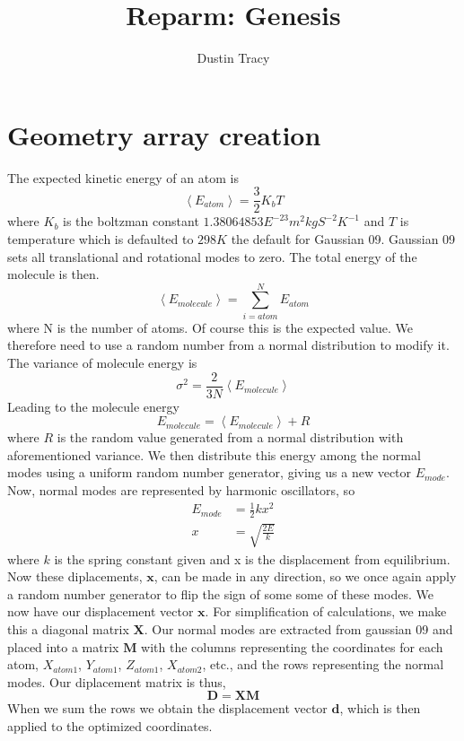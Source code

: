 \documentclass[12pt]{article}
\title{Reparm: Genesis}
\author{Dustin Tracy}
\begin{document}
\maketitle

\section{Geometry array creation}
The expected kinetic energy of an atom is
\begin{equation}
  \label{eq:energy_atom}
  \left<E_{atom}\right>=\frac{3}{2}K_{b}T
\end{equation}
where $K_b$ is the boltzman constant $1.38064853E^{-23}m^2kgS^{-2}K^{-1}$ and $T$ is temperature which is defaulted to $298K$ the default for Gaussian 09.
Gaussian 09 sets all translational and rotational modes to zero.
The total energy of the molecule is then.
\begin{equation}
  \label{eq:energy_molecule}
 \left<E_{molecule}\right>=\sum_{i=atom}^{N}E_{atom}
\end{equation}
where N is the number of atoms.
Of course this is the expected value.
We therefore need to use a random number from a normal distribution to modify it. 
The variance of molecule energy is
\begin{equation}
  \label{eq:energy_variance}
  \sigma^2=\frac{2}{3N}\left<E_{molecule}\right>
\end{equation}
Leading to the molecule energy
\begin{equation}
  \label{eq:adj_molecule_energy}
  E_{molecule}= \left<E_{molecule}\right> + R
\end{equation}
where $R$ is the random value generated from a normal distribution with aforementioned variance.
We then distribute this energy among the normal modes using a uniform random number generator, giving us a new vector $E_{mode}$.
Now, normal modes are represented by harmonic oscillators, so 
\begin{align}
  E_{mode}&=\frac{1}{2}kx^2\\
  x&=\sqrt{\frac{2E}{k}}
\end{align}
where $k$ is the spring constant given  and x is the displacement from equilibrium.
Now these diplacements, $\mathbf{x}$, can be made in any direction, so we once again apply a random number generator to flip the sign of some some of these modes.
We now have our displacement vector $\mathbf{x}$.
For simplification of calculations, we make this a diagonal matrix $\mathbf{X}$.
Our normal modes are extracted from gaussian 09 and placed into a matrix $\mathbf{M}$ with the columns representing the coordinates for each atom, $X_{atom1}$, $Y_{atom1}$, $Z_{atom1}$, $X_{atom2}$, etc., and the rows representing the normal modes.
Our diplacement matrix is thus,
\begin{equation}
  \label{eq:displacement}
 \mathbf{D}=\mathbf{XM} 
\end{equation}
When we sum the rows we obtain the displacement vector $\mathbf{d}$, which is then applied to the optimized coordinates.
\end{document}
